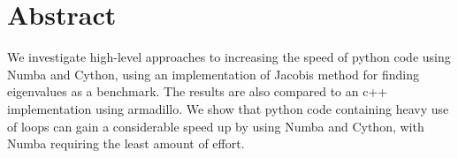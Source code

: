 \section*{Abstract}
We investigate high-level approaches to increasing the speed of python code
using Numba and Cython, using an implementation of Jacobis method for finding
eigenvalues as a benchmark. The results are also compared to an c++
implementation using armadillo. We show that python code containing heavy use of
loops can gain a considerable speed up by using Numba and Cython, with Numba
requiring the least amount of effort.
